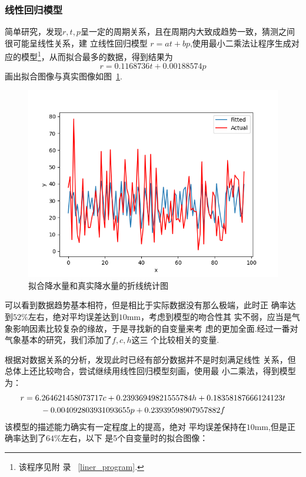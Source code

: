 \documentclass[UTF8, a4paper]{ctexart}
\begin{document}
\subsubsection{线性回归模型}

简单研究，发现$r,t,p$呈一定的周期关系，且在周期内大致成趋势一致，猜测之间很可能呈线性关系，建
立线性回归模型 $r=at+bp$,使用最小二乘法让程序生成对应的模型\footnote{该程序见附
	录~\textcolor{red}{ \ref{liner_program}}.}，从而拟合最多的数据，得到结果为
$$r=0.1168736t+0.00188574p$$画出拟合图像与真实图像如图~\textcolor{red}{\ref{pic7}}.

\begin{figure}[h!]
	\centering
	\includegraphics[scale=0.3]{fit1.png}
	\caption{拟合降水量和真实降水量的折线统计图\label{pic7}}

\end{figure}
可以看到数据趋势基本相符，但是相比于实际数据没有那么极端，此时正
确率达到$52\%$左右，绝对平均误差达到$10$mm，考虑到模型的吻合性其
实不弱，应当是气象影响因素比较复杂的缘故，于是寻找新的自变量来考
虑的更加全面.经过一番对气象基本的研究，我们添加了$f,c,h$这三
个比较相关的变量.

根据对数据关系的分析，发现此时已经有部分数据并不是时刻满足线性
关系，但总体上还比较吻合，尝试继续用线性回归模型刻画，使用最
小二乘法，得到模型为：
\begin{align}
	\notag
	r & =6.264621458073717c+0.23936949821555784h+0.18358187666124123t \\
	\notag
	  & \qquad -0.004092803931093655p+0.23939598907957882f
\end{align}
该模型的描述能力确实有一定程度上的提高，绝对
平均误差保持在$10$mm,但是正确率达到了$64\%$左右，以下
是5个自变量时的拟合图像：
\end{document}
